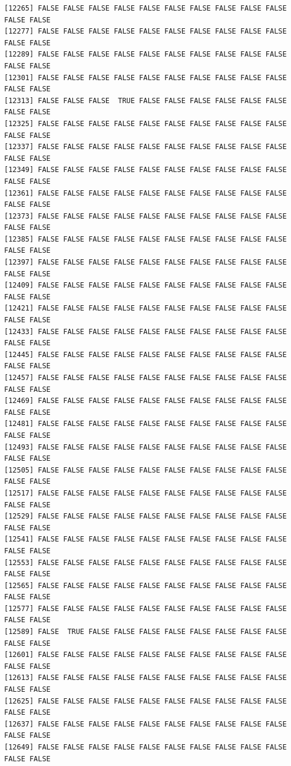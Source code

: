 \documentclass[
  a4paper,
  DIV=11,
  numbers=noendperiod]{scrartcl}
\begin{document}
\begin{verbatim}
[12265] FALSE FALSE FALSE FALSE FALSE FALSE FALSE FALSE FALSE FALSE FALSE FALSE
[12277] FALSE FALSE FALSE FALSE FALSE FALSE FALSE FALSE FALSE FALSE FALSE FALSE
[12289] FALSE FALSE FALSE FALSE FALSE FALSE FALSE FALSE FALSE FALSE FALSE FALSE
[12301] FALSE FALSE FALSE FALSE FALSE FALSE FALSE FALSE FALSE FALSE FALSE FALSE
[12313] FALSE FALSE FALSE  TRUE FALSE FALSE FALSE FALSE FALSE FALSE FALSE FALSE
[12325] FALSE FALSE FALSE FALSE FALSE FALSE FALSE FALSE FALSE FALSE FALSE FALSE
[12337] FALSE FALSE FALSE FALSE FALSE FALSE FALSE FALSE FALSE FALSE FALSE FALSE
[12349] FALSE FALSE FALSE FALSE FALSE FALSE FALSE FALSE FALSE FALSE FALSE FALSE
[12361] FALSE FALSE FALSE FALSE FALSE FALSE FALSE FALSE FALSE FALSE FALSE FALSE
[12373] FALSE FALSE FALSE FALSE FALSE FALSE FALSE FALSE FALSE FALSE FALSE FALSE
[12385] FALSE FALSE FALSE FALSE FALSE FALSE FALSE FALSE FALSE FALSE FALSE FALSE
[12397] FALSE FALSE FALSE FALSE FALSE FALSE FALSE FALSE FALSE FALSE FALSE FALSE
[12409] FALSE FALSE FALSE FALSE FALSE FALSE FALSE FALSE FALSE FALSE FALSE FALSE
[12421] FALSE FALSE FALSE FALSE FALSE FALSE FALSE FALSE FALSE FALSE FALSE FALSE
[12433] FALSE FALSE FALSE FALSE FALSE FALSE FALSE FALSE FALSE FALSE FALSE FALSE
[12445] FALSE FALSE FALSE FALSE FALSE FALSE FALSE FALSE FALSE FALSE FALSE FALSE
[12457] FALSE FALSE FALSE FALSE FALSE FALSE FALSE FALSE FALSE FALSE FALSE FALSE
[12469] FALSE FALSE FALSE FALSE FALSE FALSE FALSE FALSE FALSE FALSE FALSE FALSE
[12481] FALSE FALSE FALSE FALSE FALSE FALSE FALSE FALSE FALSE FALSE FALSE FALSE
[12493] FALSE FALSE FALSE FALSE FALSE FALSE FALSE FALSE FALSE FALSE FALSE FALSE
[12505] FALSE FALSE FALSE FALSE FALSE FALSE FALSE FALSE FALSE FALSE FALSE FALSE
[12517] FALSE FALSE FALSE FALSE FALSE FALSE FALSE FALSE FALSE FALSE FALSE FALSE
[12529] FALSE FALSE FALSE FALSE FALSE FALSE FALSE FALSE FALSE FALSE FALSE FALSE
[12541] FALSE FALSE FALSE FALSE FALSE FALSE FALSE FALSE FALSE FALSE FALSE FALSE
[12553] FALSE FALSE FALSE FALSE FALSE FALSE FALSE FALSE FALSE FALSE FALSE FALSE
[12565] FALSE FALSE FALSE FALSE FALSE FALSE FALSE FALSE FALSE FALSE FALSE FALSE
[12577] FALSE FALSE FALSE FALSE FALSE FALSE FALSE FALSE FALSE FALSE FALSE FALSE
[12589] FALSE  TRUE FALSE FALSE FALSE FALSE FALSE FALSE FALSE FALSE FALSE FALSE
[12601] FALSE FALSE FALSE FALSE FALSE FALSE FALSE FALSE FALSE FALSE FALSE FALSE
[12613] FALSE FALSE FALSE FALSE FALSE FALSE FALSE FALSE FALSE FALSE FALSE FALSE
[12625] FALSE FALSE FALSE FALSE FALSE FALSE FALSE FALSE FALSE FALSE FALSE FALSE
[12637] FALSE FALSE FALSE FALSE FALSE FALSE FALSE FALSE FALSE FALSE FALSE FALSE
[12649] FALSE FALSE FALSE FALSE FALSE FALSE FALSE FALSE FALSE FALSE FALSE FALSE

\end{verbatim}
\end{document}
